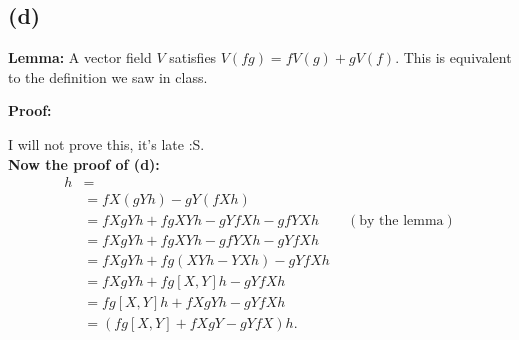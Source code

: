 \documentclass{article}
\begin{document}
\subsection*{(d)}
\textbf{Lemma:} A vector field $V$ satisfies $V(fg)=fV(g)+gV(f)$. This is equivalent to the definition we saw in class.

\textbf{Proof:}

I will not prove this, it's late :S.\\
\textbf{Now the proof of (d):}
\begin{align*}
[fX,gY]h
&=\\
&=fX(gYh)-gY(fXh)\\
&=fXgYh+fgXYh-gYfXh-gfYXh\qquad(\text{by the lemma})\\
&=fXgYh+fgXYh-gfYXh-gYfXh\\
&=fXgYh+fg(XYh-YXh)-gYfXh\\
&=fXgYh+fg[X,Y]h-gYfXh\\
&=fg[X,Y]h+fXgYh-gYfXh\\
&=(fg[X,Y]+fXgY-gYfX)h.
\end{align*}
\end{document}
